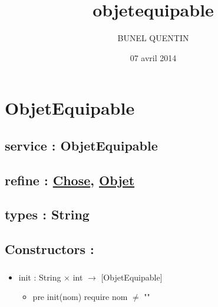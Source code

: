 \documentclass[11pt]{article}
\title{objetequipable}
\author{BUNEL QUENTIN}
\date{07 avril 2014}
\begin{document}
\maketitle

\setcounter{tocdepth}{3}
\tableofcontents
\vspace*{1cm}
\section{ObjetEquipable}
\label{sec-1}

\subsection{service : ObjetEquipable}
\label{sec-1.1}

\subsection{refine : \href{file:///users/Etu5/3000675/Desktop/spec/chose.org}{Chose}, \href{file:///users/Etu5/3000675/Desktop/spec/objet.org}{Objet}}
\label{sec-1.2}

\subsection{types : String}
\label{sec-1.3}


\subsection{Constructors :}
\label{sec-1.4}

\subsubsection{}

\begin{itemize}

\item init : String $\times$ int $\to$ [ObjetEquipable]\\
\label{sec-1.4.1.1}

\begin{itemize}

\item pre init(nom) require nom $\neq$ ""\\
\label{sec-1.4.1.1.1}

\end{itemize} %
\end{itemize} %
\end{document}
